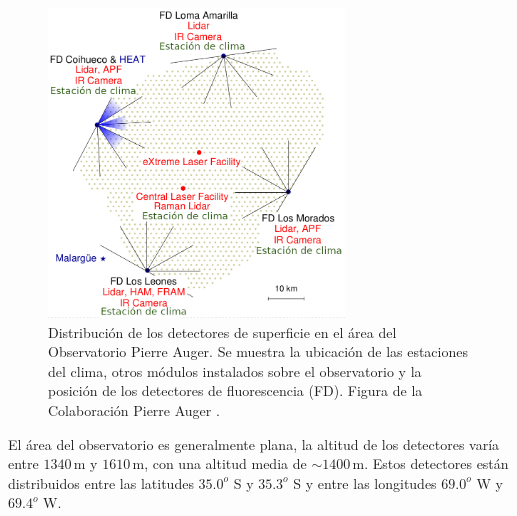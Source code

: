 \begin{figure}[H]
	\centering
	\includegraphics[width=0.7\textwidth]{auger_sd.png}
	\caption{Distribución de los detectores de superficie en el área del Observatorio Pierre Auger. Se muestra la ubicación de las estaciones del clima, otros módulos instalados sobre el observatorio y la posición de los detectores de fluorescencia (FD). Figura de la Colaboración Pierre Auger \cite{como_funciona_auger}.}
	\label{fig:auger_sd}
\end{figure}



El área del observatorio es generalmente plana, la altitud de los detectores varía entre $1340\,$m y $1610\,$m, con una altitud media de $\sim1400\,$m. Estos detectores están distribuidos entre las latitudes $35.0^o$ S y $35.3^o$ S y entre las longitudes $69.0^o$ W y $69.4^o$ W.


